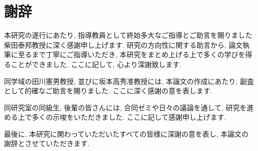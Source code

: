 { \setlength{\parskip}{0.7em}

\chapter*{謝辞}

本研究の遂行にあたり,
指導教員として終始多大なご指導とご助言を賜りました
柴田泰邦教授に深く感謝申し上げます.
研究の方向性に関する助言から, 
論文執筆に至るまで丁寧にご指導いただき,
本研究をまとめ上げる上で多くの学びを得ることができました.
ここに記して, 
心より深謝致します.

同学域の田川憲男教授,
並びに坂本高秀准教授には,
本論文の作成にあたり, 
副査として的確なご助言を賜りました.
ここに深く感謝の意を表します.

同研究室の同級生, 後輩の皆さんには,
合同ゼミや日々の議論を通して, 
研究を進める上で多くの示唆をいただきました.
ここに記して感謝申し上げます.

最後に, 
本研究に関わっていただいたすべての皆様に深謝の意を表し,
本論文の謝辞とさせていただきます.

}

